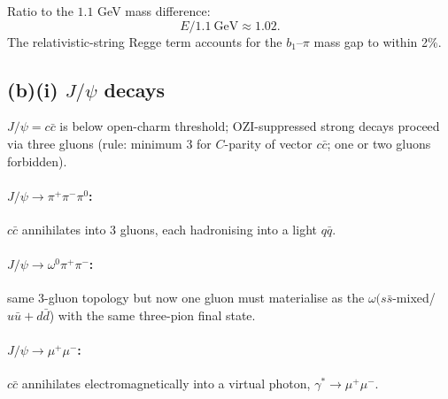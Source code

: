 \documentclass[11pt]{article}
\begin{document}
Ratio to the $1.1$ GeV mass difference:
\[ E / 1.1\ \mathrm{GeV} \approx 1.02. \]
The relativistic-string Regge term accounts for the $b_1$--$\pi$ mass gap to within 2\%.

\subsection*{(b)(i) $J/\psi$ decays}

$J/\psi=c\bar c$ is below open-charm threshold; OZI-suppressed strong decays proceed via three gluons (rule: minimum 3 for $C$-parity of vector $c\bar c$; one or two gluons forbidden).

\paragraph{$J/\psi\to \pi^+\pi^-\pi^0$:} $c\bar c$ annihilates into 3 gluons, each hadronising into a light $q\bar q$.

\begin{center}
\end{center}

\paragraph{$J/\psi\to \omega^0\pi^+\pi^-$:} same 3-gluon topology but now one gluon must materialise as the $\omega(s\bar s$-mixed/$u\bar u +d\bar d$) with the same three-pion final state.

\paragraph{$J/\psi\to \mu^+\mu^-$:} $c\bar c$ annihilates electromagnetically into a virtual photon, $\gamma^*\to\mu^+\mu^-$.
\end{document}
